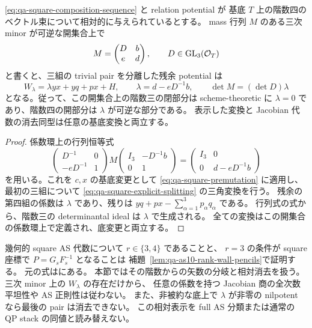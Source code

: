 \begin{proposition}
\label{prop:qa-square-relative-schur}
\eqref{eq:qa-square-composition-sequence} と relation potential が
基底 $T$ 上の階数四のベクトル束について相対的に与えられているとする。
mass 行列 $M$ のある三次 minor が可逆な開集合上で
\[
 M=\begin{pmatrix}D&b\\ e&d\end{pmatrix},\qquad D\in\operatorname{GL}_3(\mathcal O_T)
\]
と書くと、三組の trivial pair を分離した残余 potential は
\begin{equation}
 W_\lambda=\lambda yx+yq+px+H,
 \qquad\lambda=d-eD^{-1}b,
 \qquad\det M=(\det D)\lambda
 \label{eq:qa-square-schur-complement}
\end{equation}
となる。従って、この開集合上の階数三の閉部分は
scheme-theoretic に $\lambda=0$ であり、階数四の開部分は
$\lambda$ が可逆な部分である。
表示した変換と Jacobian 代数の消去同型は任意の基底変換と両立する。
\end{proposition}

\begin{proof}
係数環上の行列恒等式
\[
 \begin{pmatrix}D^{-1}&0\\-eD^{-1}&1\end{pmatrix}
 M
 \begin{pmatrix}I_3&-D^{-1}b\\0&1\end{pmatrix}
 =\begin{pmatrix}I_3&0\\0&d-eD^{-1}b\end{pmatrix}
\]
を用いる。これを $c,x$ の基底変更として
\eqref{eq:qa-square-premutation} に適用し、最初の三組について
\eqref{eq:qa-square-explicit-splitting} の三角変換を行う。
残余の第四組の係数は $\lambda$ であり、残りは
$yq+px-\sum_{\alpha=1}^3p_\alpha q_\alpha$ である。
行列式の式から、階数三の determinantal ideal は $\lambda$ で生成される。
全ての変換はこの開集合の係数環上で定義され、底変更と両立する。
\end{proof}

幾何的 square AS 代数について $r\in\{3,4\}$ であることと、
$r=3$ の条件が square 座標で $P=G_sF_s^{-1}$ となることは
補題~\ref{lem:qa-as10-rank-wall-pencils}で証明する。
元の式は\cite[補題38.1、式(38.4)]{AvatarVSeven2026}にある。
本節ではその階数からの矢数の分岐と相対消去を扱う。
三次 minor 上の $W_\lambda$ の存在だけから、
任意の係数を持つ Jacobian 商の全次数平坦性や AS 正則性は従わない。
また、非被約な底上で $\lambda$ が非零の nilpotent なら最後の pair は消去できない。
この相対表示を full AS 分類または通常の QP stack の同値と読み替えない。

